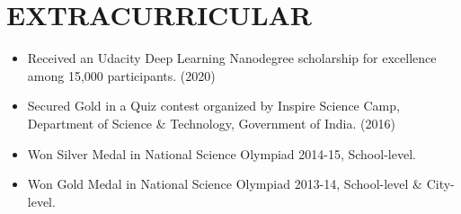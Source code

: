 \documentclass[letterpaper,11pt]{article}
\newcommand{\resumeItem}[1]{
  \item\small{
    {#1 \vspace{-2pt}}
  }
}
\newcommand{\resumeItemListStart}{\begin{itemize}}
\newcommand{\resumeItemListEnd}{\end{itemize}\vspace{-5pt}}
\begin{document}
\section{EXTRACURRICULAR}
\resumeItemListStart[itemsep=2pt]
\resumeItem{\normalsize{Received an Udacity Deep Learning Nanodegree scholarship for excellence among 15,000 participants. (2020)}}
\resumeItem{\normalsize{Secured Gold in a Quiz contest organized by Inspire Science Camp, Department of Science \& Technology, Government of India. (2016)}}
\resumeItem{\normalsize{Won Silver Medal in National Science Olympiad 2014-15, School-level.}}
\resumeItem{\normalsize{Won Gold Medal in National Science Olympiad 2013-14, School-level \& City-level.}}
\resumeItemListEnd
\end{document}
